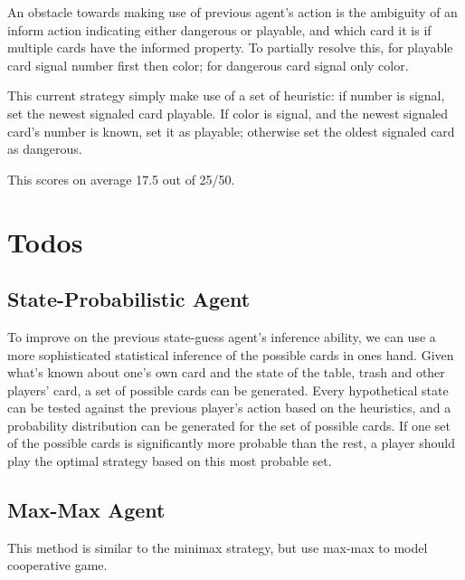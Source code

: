 \documentclass[12pt]{article}
\begin{document}
An obstacle towards making use of previous agent's action is the ambiguity of an inform action indicating either dangerous or playable, and which card it is if multiple cards have the informed property. To partially resolve this, for playable card signal number first then color; for dangerous card signal only color.

This current strategy simply make use of a set of heuristic: if number is signal, set the newest signaled card playable. If color is signal, and the newest signaled card's number is known, set it as playable; otherwise set the oldest signaled card as dangerous.

This scores on average 17.5 out of 25/50.

\section{Todos}
\subsection{State-Probabilistic Agent}
To improve on the previous state-guess agent's inference ability, we can use a more sophisticated statistical inference of the possible cards in ones hand. Given what's known about one's own card and the state of the table, trash and other players' card,  a set of possible cards can be generated. Every hypothetical state can be tested against the previous player's action based on the heuristics, and a probability distribution can be generated for the set of possible cards. If one set of the possible cards is significantly more probable than the rest, a player should play the optimal strategy based on this most probable set.

\subsection{Max-Max Agent}
This method is similar to the minimax strategy, but use max-max to model cooperative game.
\end{document}
